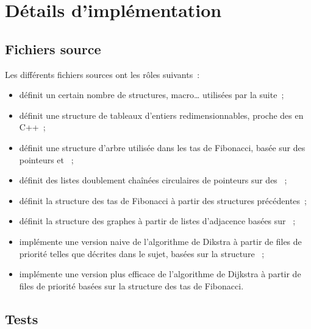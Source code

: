 \documentclass[12p0t,a4paper]{article}
\begin{document}
\section{Détails d'implémentation}

\subsection{Fichiers source}

Les différents fichiers sources ont les rôles suivants~:

\begin{itemize}
\item {} définit un certain nombre de structures, macro\ldots{} utilisées par la suite~;

\item {} définit une structure de tableaux d'entiers redimensionnables, proche des  en C++~;

\item {} définit une structure d'arbre utilisée dans les tas de Fibonacci, basée sur des pointeurs  et ~;

\item {} définit des listes doublement chaînées circulaires de pointeurs sur des ~;

\item {} définit la structure des tas de Fibonacci à partir des structures précédentes~;

\item {} définit la structure des graphes à partir de listes d'adjacence basées sur ~;

\item {} implémente une version naive de l'algorithme de Dikstra à partir de files de priorité telles que décrites dans le sujet, basées sur la structure ~;

\item {} implémente une version plus efficace de l'algorithme de Dijkstra à partir de files de priorité basées sur la structure des tas de Fibonacci.
\end{itemize}

\subsection{Tests}
\end{document}
